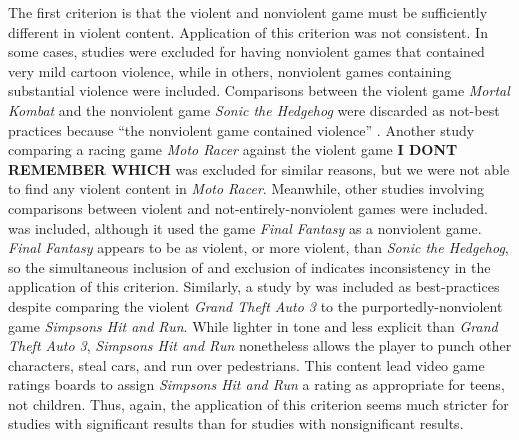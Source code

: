 \documentclass[man]{apa6}
\begin{document}
The first criterion is that the violent and nonviolent game must be sufficiently different in violent content. Application of this criterion was not consistent. In some cases, studies were excluded for having nonviolent games that contained very mild cartoon violence, while in others, nonviolent games containing substantial violence were included. Comparisons between the violent game {\em Mortal Kombat} and the nonviolent game {\em Sonic the Hedgehog} were discarded as not-best practices \citep[e.g.,][]{CITATION:NEEDED:2000} because ``the nonviolent game contained violence'' \citep[supplementary materials]{Anderson:etal:2010}. Another study comparing a racing game {\em Moto Racer} against the violent game \textbf{I DONT REMEMBER WHICH} \citep{Brooks:1996} was excluded for similar reasons, but we were not able to find any violent content in {\em Moto Racer}. Meanwhile, other studies involving comparisons between violent and not-entirely-nonviolent games were included. \citet{Konijn:etal:2007} was included, although it used the game {\em Final Fantasy} as a nonviolent game. {\em Final Fantasy} appears to be as violent, or more violent, than {\em Sonic the Hedgehog}, so the simultaneous inclusion of \citet{Konijn:etal:2007} and exclusion of \citet{CITATION:NEEDED:2000} indicates inconsistency in the application of this criterion. Similarly, a study by \citet{Brady:Mathews:2006} was included as best-practices despite comparing the violent {\em Grand Theft Auto 3} to the purportedly-nonviolent game {\em Simpsons Hit and Run}. While lighter in tone and less explicit than {\em Grand Theft Auto 3}, {\em Simpsons Hit and Run} nonetheless allows the player to punch other characters, steal cars, and run over pedestrians. This content lead video game ratings boards to assign {\em Simpsons Hit and Run} a rating as appropriate for teens, not children. Thus, again, the application of this criterion seems much stricter for studies with significant results than for studies with nonsignificant results.
\end{document}
